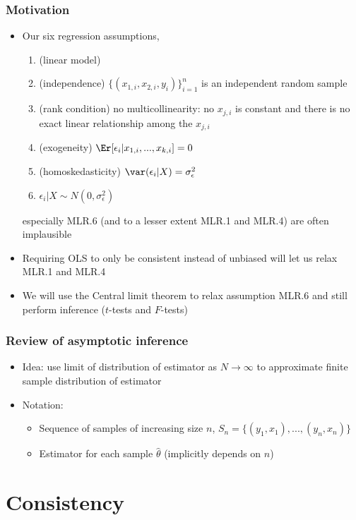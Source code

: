 \begin{frame}\frametitle{Motivation}
  \begin{itemize}
  \item Our six regression assumptions,
    \begin{enumerate}
    \item[MLR.1] (linear model) 
    \item[MLR.2] (independence) $\{(x_{1,i},x_{2,i},y_i)\}_{i=1}^n$ is
      an independent random sample
    \item[MLR.3] (rank condition) no multicollinearity: no $x_{j,i}$ is
      constant and there is no exact linear relationship among the $x_{j,i}$
    \item[MLR.4] (exogeneity) $\Er[\epsilon_i | x_{1,i},..., x_{k,i}]
      = 0$
    \item[MLR.5] (homoskedasticity) $\var(\epsilon_i | X) =
      \sigma^2_\epsilon$
    \item[MLR.6] $\epsilon_i |X \sim N(0,\sigma_\epsilon^2)$
    \end{enumerate}
    especially MLR.6 (and to a lesser extent MLR.1 and MLR.4) are often
    implausible 
  \item Requiring OLS to only be consistent instead of unbiased will
    let us relax MLR.1 and MLR.4
  \item We will use the Central limit theorem to relax assumption
    MLR.6 and still perform inference ($t$-tests and $F$-tests) 
  \end{itemize}
\end{frame}

\begin{frame}\frametitle{Review of asymptotic inference}
  \begin{itemize}
  \item Idea: use limit of distribution of estimator as $N \to \infty$ 
    to approximate finite sample distribution of estimator 
  \item Notation:
    \begin{itemize}
    \item Sequence of samples of increasing size $n$, $S_n = \{(y_1,x_1),
      ..., (y_n,x_n)\}$
    \item Estimator for each sample $\hat{\theta}$ (implicitly depends
      on $n$)
    \end{itemize}
  \end{itemize}
\end{frame}

\section{Consistency}

